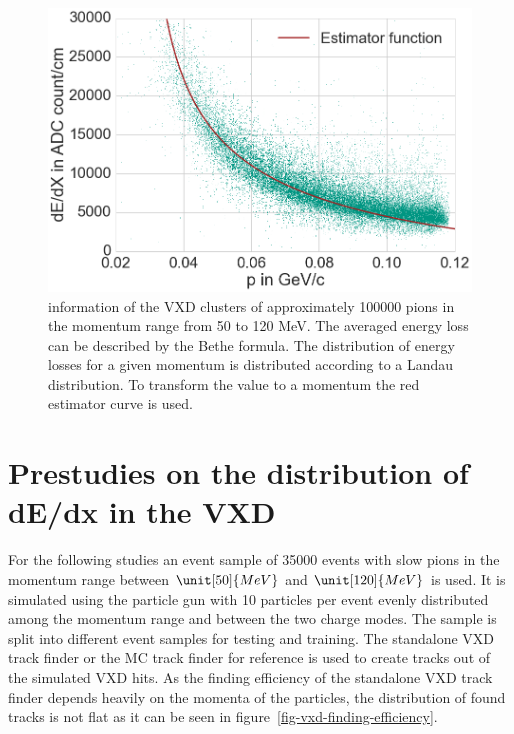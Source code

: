 \begin{figure}
 \centering
 \includegraphics[width=0.7\linewidth]{figures/vxd/dedxWithEstimator.png}
 \caption[\dedx information of the VXD clusters.]{\dedx information of the VXD clusters of approximately 100000 pions in the momentum range from 50 to 120 MeV. The averaged energy loss can be described by the Bethe formula. The distribution of energy losses for a given momentum is distributed according to a Landau distribution. To transform the \dedx value to a momentum the red estimator curve is used.}
 \label{fig-dedx-over-p}
\end{figure}


\section{Prestudies on the distribution of dE/dx in the VXD}

For the following studies an event sample of 35000 events with slow pions in the momentum range between $\unit[50]{MeV}$ and $\unit[120]{MeV}$ is used. It is simulated using the particle gun with 10 particles per event evenly distributed among the momentum range and between the two charge modes. The sample is split into different event samples for testing and training. The standalone VXD track finder or the MC track finder for reference is used to create tracks out of the simulated VXD hits. As the finding efficiency of the standalone VXD track finder depends heavily on the momenta of the particles, the distribution of found tracks is not flat as it can be seen in figure~\ref{fig-vxd-finding-efficiency}. 

